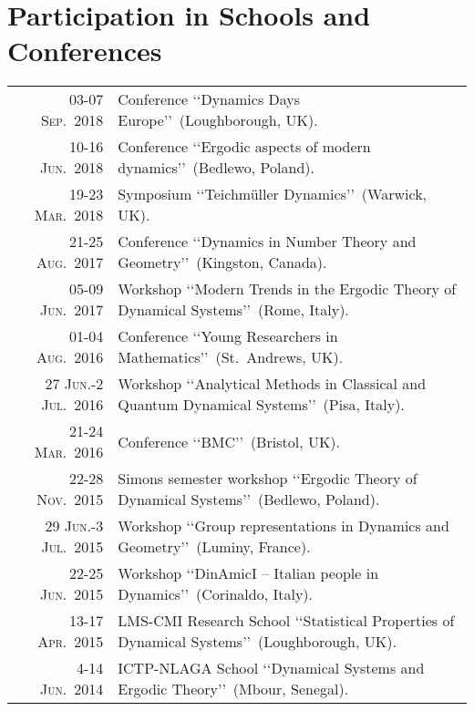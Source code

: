 \documentclass[a4paper,10pt]{article}
\begin{document}
\section{Participation in Schools and Conferences}
\begin{tabularx}{\linewidth}{r X}
%
\textsc{03-07 Sep.~2018} & Conference \lq\lq Dynamics Days Europe\rq\rq\ (Loughborough, UK). \\
%
\textsc{10-16 Jun.~2018} & Conference \lq\lq Ergodic aspects of modern dynamics\rq\rq\ (Bedlewo, Poland). \\ 
%
\textsc{19-23 Mar.~2018} & Symposium \lq\lq Teichm\"{u}ller Dynamics\rq\rq\ (Warwick, UK). \\
%
\textsc{21-25 Aug.~2017} & Conference \lq\lq Dynamics in Number Theory and Geometry\rq\rq\ (Kingston, Canada). \\
%
\textsc{05-09 Jun.~2017} & Workshop \lq\lq Modern Trends in the Ergodic Theory of Dynamical Systems\rq\rq\ (Rome, Italy).\\
%
\textsc{01-04 Aug.~2016} & Conference \lq\lq Young Researchers in Mathematics\rq\rq\ (St.~Andrews, UK). \\
%
\textsc{27 Jun.-2 Jul.~2016} & Workshop \lq\lq Analytical Methods in Classical and Quantum Dynamical Systems\rq\rq\ (Pisa, Italy). \\
%
\textsc{21-24 Mar.~2016} & Conference \lq\lq BMC\rq\rq\ (Bristol, UK). \\
%
\textsc{22-28 Nov.~2015} & Simons semester workshop \lq\lq Ergodic Theory of Dynamical Systems\rq\rq\ (Bedlewo, Poland). \\
%
\textsc{29 Jun.-3 Jul.~2015} & Workshop \lq\lq Group representations in Dynamics and Geometry\rq\rq\ (Luminy, France). \\
%
\textsc{22-25 Jun.~2015} & Workshop \lq\lq DinAmicI – Italian people in Dynamics\rq\rq\ (Corinaldo, Italy). \\
%
\textsc{13-17 Apr.~2015} & LMS-CMI Research School \lq\lq Statistical Properties of Dynamical Systems\rq\rq\ (Loughborough, UK). \\
%
\textsc{4-14 Jun.~2014} & ICTP-NLAGA School \lq\lq Dynamical Systems and Ergodic Theory\rq\rq\ (Mbour, Senegal). \\
\end{tabularx}


\end{document}
